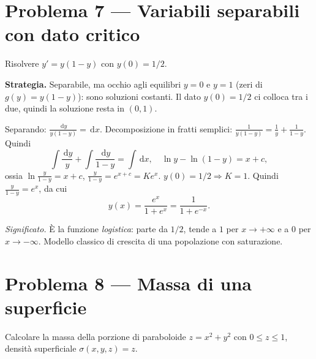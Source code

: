 \documentclass[11pt,a4paper,openany]{book}
\theoremstyle{plain}
\theoremstyle{definition}
\theoremstyle{remark}
\newcommand{\dd}{\,\mathrm{d}}
\begin{document}
\section*{Problema 7 --- Variabili separabili con dato critico}

Risolvere $y'=y(1-y)$ con $y(0)=1/2$.

\begin{esempio}
\textbf{Strategia.} Separabile, ma occhio agli equilibri $y=0$ e $y=1$ (zeri di
$g(y)=y(1-y)$): sono soluzioni costanti. Il dato $y(0)=1/2$ ci colloca tra i
due, quindi la soluzione resta in $(0,1)$.

Separando: $\frac{\dd y}{y(1-y)}=\dd x$. Decomposizione in fratti semplici:
$\frac{1}{y(1-y)}=\frac{1}{y}+\frac{1}{1-y}$. Quindi
\[
  \int\frac{\dd y}{y}+\int\frac{\dd y}{1-y}=\int\dd x,\quad
  \ln y-\ln(1-y)=x+c,
\]
ossia $\ln\frac{y}{1-y}=x+c$, $\frac{y}{1-y}=e^{x+c}=Ke^x$.
$y(0)=1/2\Rightarrow K=1$. Quindi $\frac{y}{1-y}=e^x$, da cui
\[
  y(x)=\frac{e^x}{1+e^x}=\frac{1}{1+e^{-x}}.
\]

\textsl{Significato.} \`E la funzione \emph{logistica}: parte da $1/2$, tende
a $1$ per $x\to+\infty$ e a $0$ per $x\to-\infty$. Modello classico di
crescita di una popolazione con saturazione.
\end{esempio}

\section*{Problema 8 --- Massa di una superficie}

Calcolare la massa della porzione di paraboloide $z=x^2+y^2$ con $0\le z\le 1$,
densit\`a superficiale $\sigma(x,y,z)=z$.
\end{document}
